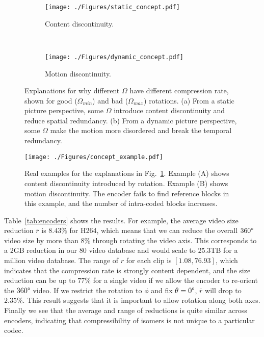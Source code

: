 \documentclass[journal,transmag]{IEEEtran}
\begin{document}
\begin{figure*}[t]
    \center
    \begin{subfigure}[c]{0.305\linewidth}
        \centering
        \texttt{[image: ./Figures/static\_concept.pdf]}
        \caption{
            Content discontinuity.
        }
    \end{subfigure}
    ~~~
    \begin{subfigure}[c]{0.65\linewidth}
        \centering
        \texttt{[image: ./Figures/dynamic\_concept.pdf]}
        \caption{
            Motion discontinuity.
        }
    \end{subfigure}
    \caption{
        \label{fig:concept}
        Explanations for why different $\Omega$ have different compression rate, shown for good ($\Omega_{min}$) and bad ($\Omega_{max}$) rotations.
        (a) From a static picture perspective,
        some $\Omega$ introduce content discontinuity and reduce spatial redundancy.
        (b) From a dynamic picture perspective,
        some $\Omega$ make the motion more disordered and break the temporal redundancy.
    }
\end{figure*}\begin{figure*}[t]
    \centering
    \texttt{[image: ./Figures/concept\_example.pdf]}
    \caption{
        \label{fig:concept_example}
        Real examples for the explanations in Fig.~\ref{fig:concept}.
        Example (A) shows content discontinuity introduced by rotation.
        Example (B) shows motion discontinuity.
        The encoder fails to find reference blocks in this example,
        and the number of intra-coded blocks increases.
    }
\end{figure*}

Table~\ref{tab:encoders} shows the results.  
For example, the average video size reduction $\overline{r}$ is $8.43\%$ for H264,
which means that we can reduce the overall $360\degree$ video size by more than $8\%$ through rotating the video axis.
This corresponds to a 2GB reduction in our 80 video database and would scale to 25.3TB for a million video database.
The range of $r$ for each clip is $[1.08, 76.93]$,
which indicates that the compression rate is strongly content dependent,
and the size reduction can be up to $77\%$ for a single video if we allow the encoder to re-orient the $360\degree$ video.
If we restrict the rotation to $\phi$ and fix $\theta=0\degree$,
$\overline{r}$ will drop to $2.35\%$.
This result suggests that it is important to allow rotation along both axes.  
Finally we see that the average and range of reductions is quite similar across encoders, indicating that compressibility of isomers is not unique to a particular codec.
\end{document}
